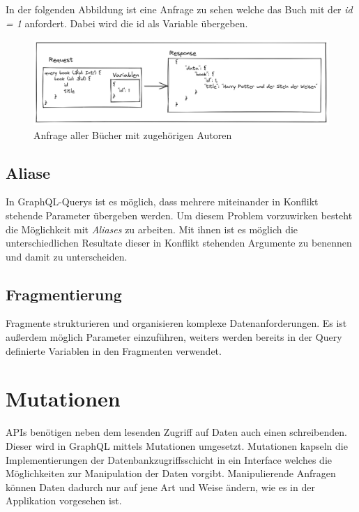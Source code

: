 In der folgenden Abbildung ist eine Anfrage zu sehen welche das Buch mit der \textit{id = 1} anfordert. Dabei wird die id als Variable übergeben.

\begin{figure}[H]
    \includegraphics[width=\textwidth]{pics/book_request_with_parameter.png}
    \caption{Anfrage aller Bücher mit zugehörigen Autoren}
\end{figure}

\subsection{Aliase}
In GraphQL-Querys ist es möglich, dass mehrere miteinander in Konflikt stehende Parameter übergeben werden.
Um diesem Problem vorzuwirken besteht die Möglichkeit mit \textit{Aliases} zu arbeiten.
Mit ihnen ist es möglich die unterschiedlichen Resultate dieser in Konflikt stehenden Argumente zu benennen und damit zu unterscheiden.

\subsection{Fragmentierung}
Fragmente strukturieren und organisieren komplexe Datenanforderungen.
Es ist außerdem möglich Parameter einzuführen, weiters werden bereits in der Query definierte Variablen in den Fragmenten verwendet.


\section{Mutationen}
APIs benötigen neben dem lesenden Zugriff auf Daten auch einen schreibenden.
Dieser wird in GraphQL mittels Mutationen umgesetzt.
Mutationen kapseln die Implementierungen der Datenbankzugriffsschicht in ein Interface welches die Möglichkeiten zur Manipulation der Daten vorgibt.
Manipulierende Anfragen können Daten dadurch nur auf jene Art und Weise ändern, wie es in der Applikation vorgesehen ist.



